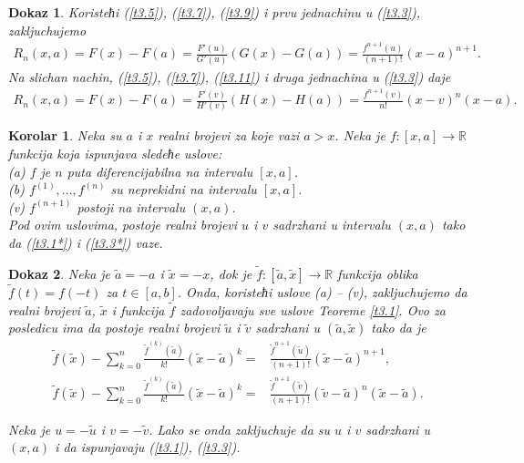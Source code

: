 \documentclass[12pt,a4paper]{article}
\newtheorem{cor}{Korolar}%
\newtheorem*{dokaz}{Dokaz}
\begin{document}
\begin{dokaz}
 Koristeћi (\ref{t3.5}), (\ref{t3.7}), (\ref{t3.9}) 
 i prvu jednachinu u (\ref{t3.3}), zakljuchujemo 
 \begin{align*}
     R_{n}(x,a)
     =
     F(x)-F(a)
     =
     \frac{F'(u)}{G'(u)}(G(x)-G(a))
     =
     \frac{f^{n+1}(u)}{(n+1)!}(x-a)^{n+1}. 
 \end{align*}
 Na slichan nachin, (\ref{t3.5}), (\ref{t3.7}), (\ref{t3.11}) 
 i druga jednachina u (\ref{t3.3}) daje  
 \begin{align*}
     R_{n}(x,a)
     =
     F(x)-F(a)
     =
     \frac{F'(v)}{H'(v)}(H(x)-H(a))
     =
     \frac{f^{n+1}(v)}{n!}(x-v)^{n}(x-a). 
 \end{align*}
 \end{dokaz}
 
 \begin{cor}\label{cor1}
 Neka su $a$ i $x$ realni brojevi za koje vazi $a>x$. 
 Neka je $f:[x,a]\rightarrow\mathbb{R}$ funkcija 
 koja ispunjava sledeћe uslove: 
 \\
 (a) $f$ je $n$ puta diferencijabilna na intervalu 
 $[x,a]$. 
 \\
(b) $f^{(1)},\dots,f^{(n)}$ su neprekidni na intervalu 
 $[x,a]$. 
 \\
 (v) $f^{(n+1)}$ postoji na intervalu $(x,a)$.
 \\
 Pod ovim uslovima, postoje realni brojevi $u$ i $v$
 sadrzhani u intervalu $(x,a)$ tako da
 (\ref{t3.1*}) i (\ref{t3.3*}) vaze. 
 \end{cor}
 
 \begin{dokaz}
 Neka je $\tilde{a}=-a$ i $\tilde{x}=-x$, 
 dok je $\tilde{f}:[\tilde{a},\tilde{x}]\rightarrow\mathbb{R}$ 
 funkcija oblika $\tilde{f}(t)=f(-t)$ za $t\in[a,b]$. 
 Onda, koristeћi uslove (a) -- (v), 
 zakljuchujemo da realni brojevi $\tilde{a}$, $\tilde{x}$
 i funkcija $\tilde{f}$ zadovoljavaju sve uslove 
 Teoreme \ref{t3.1}. 
 Ovo za posledicu ima da postoje realni brojevi 
 $\tilde{u}$ i $\tilde{v}$ sadrzhani u $(\tilde{a},\tilde{x})$
 tako da je 
 \begin{align*}
     \tilde{f}(\tilde{x})
     -
     \sum_{k=0}^{n}
     \frac{\tilde{f}^{(k)}(\tilde{a})}{k!}
     (\tilde{x}-\tilde{a})^{k}
     =&
     \frac{\tilde{f}^{n+1}(\tilde{u})}{(n+1)!}
     (\tilde{x}-\tilde{a})^{n+1}, 
     \\
     \tilde{f}(\tilde{x})
     -
     \sum_{k=0}^{n}
     \frac{\tilde{f}^{(k)}(\tilde{a})}{k!}
     (\tilde{x}-\tilde{a})^{k}
     =&
     \frac{\tilde{f}^{n+1}(\tilde{v})}{(n+1)!}
     (\tilde{v}-\tilde{a})^{n}(\tilde{x}-\tilde{a}). 
 \end{align*}
 
 Neka je $u=-\tilde{u}$ i $v=-\tilde{v}$. 
 Lako se onda zakljuchuje da su $u$ i $v$ sadrzhani u $(x,a)$
 i da ispunjavaju (\ref{t3.1}), (\ref{t3.3}). 
 \end{dokaz}
 
\end{document}
